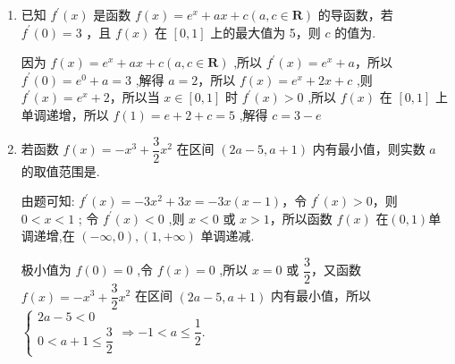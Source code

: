 \begin{enumerate}
\begin{jieda}
        当 $x =  - 1$ 时, $f\left( x\right)$ 取得极大值 $f\left( {-1}\right)  = 2 + a$，故 $f\left( x\right)  = {x}^{3} - {3x} + a\left( {x \leq  0}\right)$ 的值域为 $( - \infty ,2 + a\rbrack$
        
        故$2 + a \geq  1$，故$a \geq   - 1$ .
    \end{jieda}

    \item 已知 ${f}^{\prime }\left( x\right)$ 是函数 $f\left( x\right)  = {{e}}^{x} + {ax} + c\left( {a,c \in  \mathbf{R}}\right)$ 的导函数，若 ${f}^{\prime }\left( 0\right)  = 3$ ，且 $f\left( x\right)$ 在 $\left\lbrack  {0,1}\right\rbrack$ 上的最大值为 5，则 $c$ 的值为.
    \begin{jieda}
        因为 $f\left( x\right)  = {{e}}^{x} + {ax} + c\left( {a,c \in  \mathbf{R}}\right)$ ,所以 ${f}^{\prime }\left( x\right)  = {{e}}^{x} + a$，所以 ${f}^{\prime }\left( 0\right)  = {{e}}^{0} + a = 3$ ,解得 $a = 2$，所以 $f\left( x\right)  = {{e}}^{x} + {2x} + c$ ,则 ${f}^{\prime }\left( x\right)  = {{e}}^{x} + 2$，所以当 $x \in  \left\lbrack  {0,1}\right\rbrack$ 时 ${f}^{\prime }\left( x\right)  > 0$ ,所以 $f\left( x\right)$ 在 $\left\lbrack  {0,1}\right\rbrack$ 上单调递增，所以 $f\left( 1\right)  = {e} + 2 + c = 5$ ,解得 $c = 3 - {e}$
    \end{jieda}

    \item 若函数 $f\left( x\right)  =  -{x}^{3} + \dfrac{3}{2}{x}^{2}$ 在区间 $\left( {{2a} - 5,a + 1}\right)$ 内有最小值，则实数 $a$ 的取值范围是\blkda{$\left(-1, \dfrac{1}{2}\right]$}.
    \begin{jieda}
        由题可知: ${f}^{\prime }\left( x\right)  =  - 3{x}^{2} + {3x} =  - {3x}\left( {x - 1}\right)$，令 ${f}^{\prime }\left( x\right)  > 0$，则 $0 < x < 1$ ; 令 ${f}^{\prime }\left( x\right)  < 0$ ,则 $x < 0$ 或 $x > 1$，所以函数 $f\left( x\right)$ 在$(0,1)$单调递增,在 $\left( {-\infty ,0}\right) ,\left( {1, + \infty }\right)$ 单调递减.
        
        极小值为 $f\left( 0\right)  = 0$ ,令 $f\left( x\right)  = 0$ ,所以 $x = 0$ 或 $\dfrac{3}{2}$，又函数 $f\left( x\right)  =  - {x}^{3} + \dfrac{3}{2}{x}^{2}$ 在区间 $\left( {{2a} - 5,a + 1}\right)$ 内有最小值，所以 $\left\{  \begin{array}{l} {2a} - 5 < 0 \\  0 < a + 1 \leq  \dfrac{3}{2} \end{array}\right.  \Longrightarrow   - 1 < a \leq  \dfrac{1}{2}$.
    \end{jieda}


\end{enumerate}
